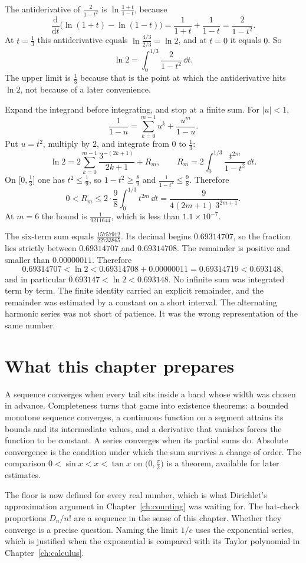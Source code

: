 The antiderivative of $\frac2{1-t^2}$ is $\ln\frac{1+t}{1-t}$, because
\[
\frac{\mathrm d}{\mathrm dt}\bigl(\ln(1+t)-\ln(1-t)\bigr)=\frac1{1+t}+\frac1{1-t}=\frac2{1-t^2}.
\]
At $t=\frac13$ this antiderivative equals $\ln\frac{4/3}{2/3}=\ln2$, and at $t=0$ it equals $0$. So
\[
\ln2=\int_0^{1/3}\frac2{1-t^2}\,\dd t.
\]
The upper limit is $\frac13$ because that is the point at which the antiderivative hits $\ln2$, not because of a later convenience.

Expand the integrand before integrating, and stop at a finite sum. For $|u|<1$,
\[
\frac1{1-u}=\sum_{k=0}^{m-1}u^k+\frac{u^m}{1-u}.
\]
Put $u=t^2$, multiply by $2$, and integrate from $0$ to $\frac13$:
\[
\ln2=2\sum_{k=0}^{m-1}\frac{3^{-(2k+1)}}{2k+1}+R_m,
\qquad
R_m=2\int_0^{1/3}\frac{t^{2m}}{1-t^2}\,\dd t.
\]
On $\bigl[0,\frac13\bigr]$ one has $t^2\le\frac19$, so $1-t^2\ge\frac89$ and $\frac1{1-t^2}\le\frac98$. Therefore
\[
0<R_m\le2\cdot\frac98\int_0^{1/3}t^{2m}\,\dd t=\frac9{4(2m+1)\,3^{2m+1}}.
\]
At $m=6$ the bound is $\frac1{9211644}$, which is less than $1.1\times10^{-7}$.

The six-term sum equals $\frac{15757912}{22733865}$. Its decimal begins $0.69314707$, so the fraction lies strictly between $0.69314707$ and $0.69314708$. The remainder is positive and smaller than $0.00000011$. Therefore
\[
0.69314707<\ln2<0.69314708+0.00000011=0.69314719<0.693148,
\]
and in particular $0.693147<\ln2<0.693148$. No infinite sum was integrated term by term. The finite identity carried an explicit remainder, and the remainder was estimated by a constant on a short interval. The alternating harmonic series was not short of patience. It was the wrong representation of the same number.

\section*{What this chapter prepares}
A sequence converges when every tail sits inside a band whose width was chosen in advance. Completeness turns that game into existence theorems: a bounded monotone sequence converges, a continuous function on a segment attains its bounds and its intermediate values, and a derivative that vanishes forces the function to be constant. A series converges when its partial sums do. Absolute convergence is the condition under which the sum survives a change of order. The comparison $0<\sin x<x<\tan x$ on $\bigl(0,\frac\pi2\bigr)$ is a theorem, available for later estimates.

The floor is now defined for every real number, which is what Dirichlet's approximation argument in Chapter~\ref{ch:counting} was waiting for. The hat-check proportions $D_n/n!$ are a sequence in the sense of this chapter. Whether they converge is a precise question. Naming the limit $1/e$ uses the exponential series, which is justified when the exponential is compared with its Taylor polynomial in Chapter~\ref{ch:calculus}.

